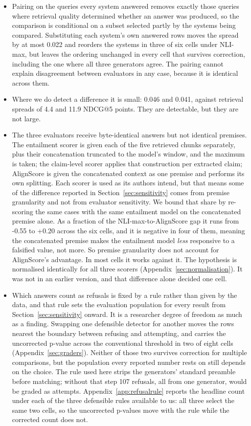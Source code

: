 \documentclass[11pt]{article}
\begin{document}
\begin{itemize}
\item Pairing on the queries every system answered removes exactly those queries where retrieval quality determined whether an answer was produced, so the comparison is conditional on a subset selected partly by the systems being compared. Substituting each system's own answered rows moves the spread by at most 0.022 and reorders the systems in three of six cells under NLI-max, but leaves the ordering unchanged in every cell that survives correction, including the one where all three generators agree. The pairing cannot explain disagreement between evaluators in any case, because it is identical across them.
\item Where we do detect a difference it is small: 0.046 and 0.041, against retrieval spreads of 4.4 and 11.9 NDCG@5 points. They are detectable, but they are not large.
\item The three evaluators receive byte-identical answers but not identical premises. The entailment scorer is given each of the five retrieved chunks separately, plus their concatenation truncated to the model's window, and the maximum is taken; the claim-level scorer applies that construction per extracted claim; AlignScore is given the concatenated context as one premise and performs its own splitting. Each scorer is used as its authors intend, but that means some of the difference reported in Section~\ref{sec:sensitivity} comes from premise granularity and not from evaluator sensitivity. We bound that share by re-scoring the same cases with the same entailment model on the concatenated premise alone. As a fraction of the NLI-max-to-AlignScore gap it runs from -0.55 to +0.20 across the six cells, and it is negative in four of them, meaning the concatenated premise makes the entailment model \emph{less} responsive to a falsified value, not more. So premise granularity does not account for AlignScore's advantage. In most cells it works against it. The hypothesis is normalised identically for all three scorers (Appendix~\ref{sec:normalisation}). It was not in an earlier version, and that difference alone decided one cell.
\item Which answers count as refusals is fixed by a rule rather than given by the data, and that rule sets the evaluation population for every result from Section~\ref{sec:sensitivity} onward. It is a researcher degree of freedom as much as a finding. Swapping one defensible detector for another moves the rows nearest the boundary between refusing and attempting, and carries the uncorrected p-value across the conventional threshold in two of eight cells (Appendix~\ref{sec:graders}). Neither of those two survives correction for multiple comparisons, but the population every reported number rests on still depends on the choice. The rule used here strips the generators' standard preamble before matching; without that step 107 refusals, all from one generator, would be graded as attempts. Appendix~\ref{app:refusalrule} reports the headline count under each of the three defensible rules available to us: all three select the same two cells, so the uncorrected p-values move with the rule while the corrected count does not.

\end{itemize}
\end{document}
